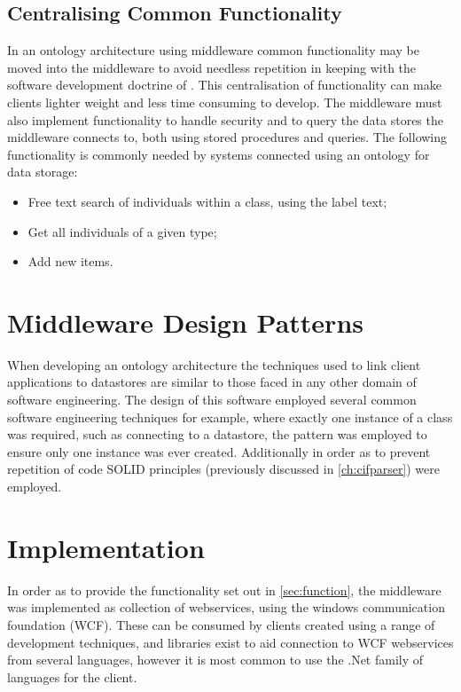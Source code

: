 \subsection{Centralising Common Functionality}\label{midfunc}
In an ontology architecture using middleware common functionality may be moved into the middleware to avoid needless repetition in keeping with the software development doctrine of . This centralisation of functionality can make clients lighter weight and less time consuming to develop. The middleware must also implement functionality to handle security and to query the data stores the middleware connects to, both using stored procedures and queries. The following functionality is commonly needed by systems connected using an ontology for data storage:
\begin{itemize}
    \item Free text search of individuals within a class, using the label text;
    \item Get all individuals of a given type;
    \item Add new items.    
\end{itemize}


\section{Middleware Design Patterns}
When developing an ontology architecture the techniques used to link client applications to datastores are similar to those faced in any other domain of software engineering. 
The design of this software employed several common software engineering techniques for example, where exactly one instance of a class was required, such as connecting to a datastore, the  pattern was employed to ensure only one instance was ever created. Additionally in order as to prevent repetition of code SOLID principles (previously discussed in \autoref{ch:cifparser}) were employed.

\section{Implementation}
In order as to provide the functionality set out in \autoref{sec:function}, the middleware was implemented as collection of webservices, using the windows communication foundation (WCF). These can be consumed by clients created using a range of development techniques, and libraries exist to aid connection to WCF webservices from several languages, however it is most common to use the .Net family of languages for the client.

